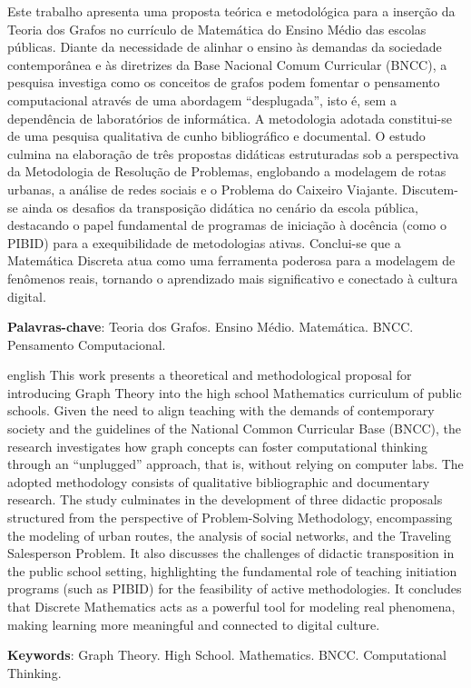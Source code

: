 \documentclass[
  12pt,
  oneside,
  a4paper,
  english,
  brazilian
  ]{abntex2}
\theoremstyle{definition}
\def\vspace#1{ }%
\begin{document}
\begin{resumo}
 Este trabalho apresenta uma proposta teórica e metodológica para a inserção da Teoria dos Grafos no currículo de Matemática do Ensino Médio das escolas públicas. Diante da necessidade de alinhar o ensino às demandas da sociedade contemporânea e às diretrizes da Base Nacional Comum Curricular (BNCC), a pesquisa investiga como os conceitos de grafos podem fomentar o pensamento computacional através de uma abordagem ``desplugada'', isto é, sem a dependência de laboratórios de informática. A metodologia adotada constitui-se de uma pesquisa qualitativa de cunho bibliográfico e documental. O estudo culmina na elaboração de três propostas didáticas estruturadas sob a perspectiva da Metodologia de Resolução de Problemas, englobando a modelagem de rotas urbanas, a análise de redes sociais e o Problema do Caixeiro Viajante. Discutem-se ainda os desafios da transposição didática no cenário da escola pública, destacando o papel fundamental de programas de iniciação à docência (como o PIBID) para a exequibilidade de metodologias ativas. Conclui-se que a Matemática Discreta atua como uma ferramenta poderosa para a modelagem de fenômenos reais, tornando o aprendizado mais significativo e conectado à cultura digital.
 \vspace{\onelineskip}
 \noindent
 \textbf{Palavras-chave}: Teoria dos Grafos. Ensino Médio. Matemática. BNCC. Pensamento Computacional.
\end{resumo}

\begin{resumo}[Abstract]
 \begin{otherlanguage*}{english}
   This work presents a theoretical and methodological proposal for introducing Graph Theory into the high school Mathematics curriculum of public schools. Given the need to align teaching with the demands of contemporary society and the guidelines of the National Common Curricular Base (BNCC), the research investigates how graph concepts can foster computational thinking through an ``unplugged'' approach, that is, without relying on computer labs. The adopted methodology consists of qualitative bibliographic and documentary research. The study culminates in the development of three didactic proposals structured from the perspective of Problem-Solving Methodology, encompassing the modeling of urban routes, the analysis of social networks, and the Traveling Salesperson Problem. It also discusses the challenges of didactic transposition in the public school setting, highlighting the fundamental role of teaching initiation programs (such as PIBID) for the feasibility of active methodologies. It concludes that Discrete Mathematics acts as a powerful tool for modeling real phenomena, making learning more meaningful and connected to digital culture.
   \vspace{\onelineskip}
   \noindent
   \textbf{Keywords}: Graph Theory. High School. Mathematics. BNCC. Computational Thinking.
 \end{otherlanguage*}
\end{resumo}
\end{document}

